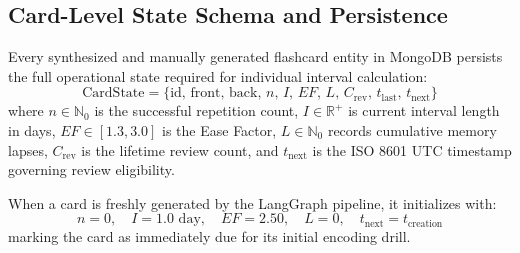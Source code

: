 \documentclass[12pt,a4paper,oneside]{report}
\begin{document}
\subsection{Card-Level State Schema and Persistence}
Every synthesized and manually generated flashcard entity in MongoDB persists the full operational state required for individual interval calculation:
\begin{equation}
    \text{CardState} = \{ \text{id}, \, \text{front}, \, \text{back}, \, n, \, I, \, EF, \, L, \, C_{\text{rev}}, \, t_{\text{last}}, \, t_{\text{next}} \}
\end{equation}
where $n \in \mathbb{N}_0$ is the successful repetition count, $I \in \mathbb{R}^+$ is current interval length in days, $EF \in [1.3, 3.0]$ is the Ease Factor, $L \in \mathbb{N}_0$ records cumulative memory lapses, $C_{\text{rev}}$ is the lifetime review count, and $t_{\text{next}}$ is the ISO 8601 UTC timestamp governing review eligibility.

When a card is freshly generated by the LangGraph pipeline, it initializes with:
\begin{equation}
    n = 0, \quad I = 1.0 \text{ day}, \quad EF = 2.50, \quad L = 0, \quad t_{\text{next}} = t_{\text{creation}}
\end{equation}
marking the card as immediately due for its initial encoding drill.
\end{document}
